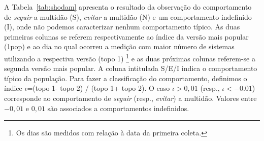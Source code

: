 	
	A Tabela~\ref{tab:shodam} apresenta o resultado da observação do comportamento de \textit{seguir} a multidão (S), \textit{evitar} a multidão (N) e um comportamento indefinido (I), onde não podemos caracterizar nenhum comportamento típico. As duas primeiras colunas se referem respectivamente ao índice da versão mais popular (1\textordmasculine pop) e ao dia no  qual ocorreu a  medição com  maior número de sistemas utilizando a respectiva versão (topo 1\textordmasculine) \footnote{Os dias são medidos com relação à data da primeira coleta.} e as duas próximas colunas referem-se a segunda versão mais popular. A coluna intitulada S/E/I  indica o comportamento típico da população. Para fazer a  classificação do comportamento, definimos  o índice $\iota$=(topo 1\textordmasculine - topo 2\textordmasculine) / (topo 1\textordmasculine + topo 2\textordmasculine).   O caso  $\iota > 0,01$ (resp., $\iota < -0.01$) corresponde ao comportamento de \textit{seguir} (resp., \emph{evitar})  a multidão.   Valores entre $-0,01$ e $0,01$ são  associados a comportamentos indefinidos.
	

